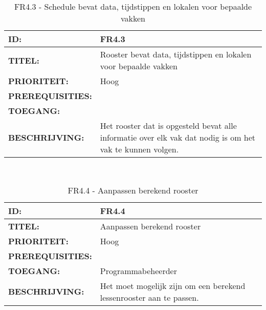 \noindent\begin{table}[H]
	\begin{tabular}{l | p{10cm}}
	\textbf{ID:} & FR4.3 \\ \hline
	\textbf{TITEL:} & Rooster bevat data, tijdstippen en lokalen voor bepaalde vakken\\ \hline
	\textbf{PRIORITEIT:} &  Hoog \\ \hline
	\textbf{PREREQUISITIES:} & \\ \hline
	\textbf{TOEGANG:} &  \\ \hline
	\textbf{BESCHRIJVING:} & Het rooster dat is opgesteld bevat alle informatie over elk vak dat nodig is om het vak te kunnen volgen.\\
	\end{tabular}\\
	\caption{FR4.3 - Schedule bevat data, tijdstippen en lokalen voor bepaalde vakken}
	\label{tab:FR4.3 - Schedule bevat data, tijdstippen en lokalen voor bepaalde vakken}
\end{table}
       
\noindent\begin{table}[H]
            \begin{tabular}{l | p{10cm}}
                \textbf{ID:} & FR4.4 \\ \hline
                \textbf{TITEL:} & Aanpassen berekend rooster \\ \hline
                \textbf{PRIORITEIT:} &  Hoog \\ \hline
                \textbf{PREREQUISITIES:} & \\ \hline
                \textbf{TOEGANG:} & Programmabeheerder \\ \hline
                \textbf{BESCHRIJVING:} & Het moet mogelijk zijn om een berekend lessenrooster aan te passen.\\
            \end{tabular}\\
            \caption{FR4.4 - Aanpassen berekend rooster}
            \label{tab:FR4.4 - Aanpassen berekend rooster}
        \end{table}
        
